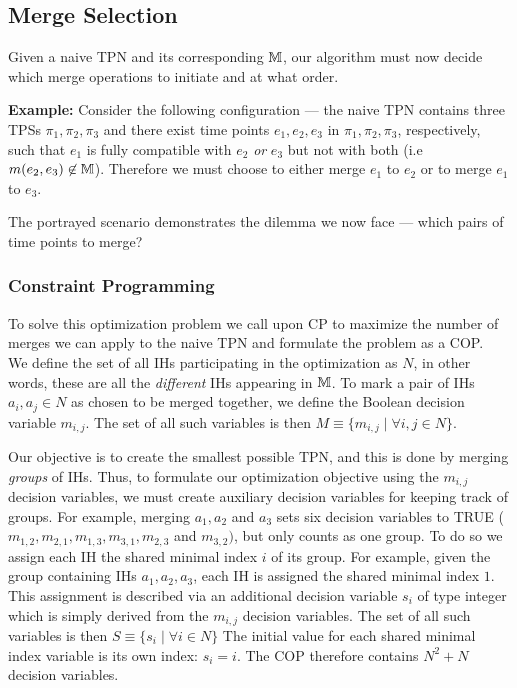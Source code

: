 \subsection{Merge Selection}
\label{generating: merge selection}
Given a naive TPN and its corresponding $\mathbb{M}$, our algorithm must now decide which 
merge operations to initiate and at what order. 

\begin{tcolorbox}[colback=blue!5!white,colframe=blue!75!black]
     \textbf{Example:} Consider the following configuration --- the naive TPN contains three
     TPSs $\pi_1,\pi_2,\pi_3$ and there exist time points 
     $e_1, e_2, e_3$ in $\pi_1, \pi_2, \pi_3$, respectively, such that $e_1$ is fully
     compatible with $e_2$ \textit{or} $e_3$ but not with both (i.e $m(e_2,e_3) \not \in \mathbb{M}$).
     Therefore we must choose to either merge $e_1$ to $e_2$ or to merge $e_1$ to $e_3$.
  \end{tcolorbox}


The portrayed scenario demonstrates the dilemma we now face --- 
which pairs of time points to merge? 


\subsubsection{Constraint Programming} To solve this optimization problem we call upon
CP to maximize the number of merges we can apply to the naive TPN and formulate the 
problem as a COP. \\ 

We define the set of all IHs participating in the optimization as $N$, in other words,
these are all the {\em different} IHs appearing in $\mathbb{M}$.
To mark a pair of IHs $a_i,a_j \in N$ as chosen to be merged together, 
we define the Boolean decision variable $m_{i,j}$. The set of all such variables is then
 $M \equiv \{m_{i,j} \mid \forall i,j \in N\}$.

Our objective is to create the smallest possible TPN, and this is done by merging {\em groups} of IHs. Thus, to formulate our optimization objective using the $m_{i,j}$ decision variables, we must create auxiliary decision variables for keeping track of groups. For example, merging $a_1, a_2$ and $a_3$ sets six decision variables to TRUE ($m_{1,2}, m_{2,1}, m_{1,3}, m_{3,1}, m_{2,3}$ and $m_{3,2})$, but only counts as one group.
To do so we assign each IH the shared minimal index $i$ of its group.
For example, given the group containing IHs $a_1,a_2,a_3$, each IH is assigned the shared minimal index $1$.
This assignment is described via an additional decision variable $s_i$ of type integer which is simply derived from the $m_{i,j}$ decision variables. The set of all such variables is then $S \equiv \{s_i \mid \forall i \in N\}$
The initial value for each shared minimal index variable is its own index: $s_i = i$.
The COP therefore contains $N^2 + N$ decision variables.

